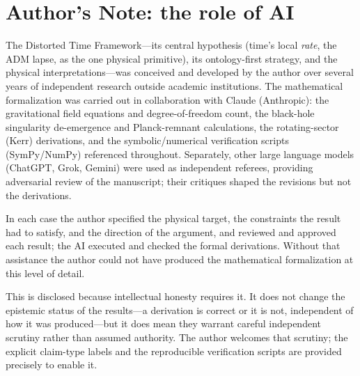 \documentclass[11pt]{article}
\begin{document}
\section*{Author's Note: the role of AI}
{\small
The Distorted Time Framework---its central hypothesis (time's local \emph{rate}, the ADM lapse,
as the one physical primitive), its ontology-first strategy, and the physical
interpretations---was conceived and developed by the author over several years of independent
research outside academic institutions. The mathematical formalization was carried out in
collaboration with Claude (Anthropic): the gravitational field equations and degree-of-freedom
count, the black-hole singularity de-emergence and Planck-remnant calculations, the rotating-sector
(Kerr) derivations, and the symbolic/numerical verification scripts (SymPy/NumPy) referenced
throughout. Separately, other large language models (ChatGPT, Grok, Gemini) were used as independent
referees, providing adversarial review of the manuscript; their critiques shaped the revisions but
not the derivations.

In each case the author specified the physical target, the constraints the result had to satisfy,
and the direction of the argument, and reviewed and approved each result; the AI executed and
checked the formal derivations. Without that assistance the author could not have produced the
mathematical formalization at this level of detail.

This is disclosed because intellectual honesty requires it. It does not change the epistemic status
of the results---a derivation is correct or it is not, independent of how it was produced---but it
does mean they warrant careful independent scrutiny rather than assumed authority. The author
welcomes that scrutiny; the explicit claim-type labels and the reproducible verification scripts are
provided precisely to enable it.
\par}
\end{document}
